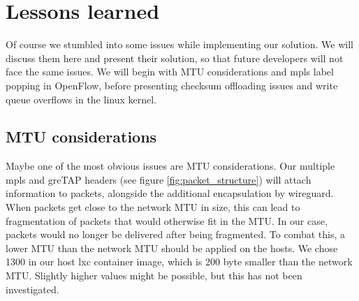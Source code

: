 \section{Lessons learned}
Of course we stumbled into some issues while implementing our solution. We will discuss them here and present their solution, so that future developers will not face the same issues. We will begin with MTU considerations and \acrshort{mpls} label popping in OpenFlow, before presenting checksum offloading issues and write queue overflows in the linux kernel.


\subsection{MTU considerations}
Maybe one of the most obvious issues are MTU considerations. Our multiple \acrshort{mpls} and \acrshort{gre}TAP headers (see figure \ref{fig:packet_structure}) will attach information to packets, alongside the additional encapsulation by wireguard. When packets get close to the network MTU in size, this can lead to fragmentation of packets that would otherwise fit in the MTU. In our case, packets would no longer be delivered after being fragmented. To combat this, a lower MTU than the network MTU should be applied on the hosts. We chose 1300 in our host \acrshort{lxc} container image, which is 200 byte smaller than the network MTU. Slightly higher values might be possible, but this has not been investigated.


